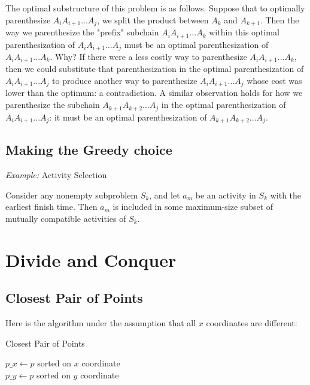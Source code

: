 \documentclass[a4paper, 12pt]{article}
\begin{document}
The optimal substructure of this problem is as follows. Suppose that to optimally parenthesize $A_iA_{i+1}...A_j$, we split the product between $A_k$ and $A_{k+1}$. Then the way we parenthesize the "prefix" subchain $A_iA_{i+1}...A_k$ within this optimal parenthesization of $A_iA_{i+1}...A_j$ must be an optimal parenthesization of $A_iA_{i+1}...A_k$. Why? If there were a less costly way to parenthesize $A_iA_{i+1}...A_k$, then we could substitute that parenthesization in the optimal parenthesization of $A_iA_{i+1}...A_j$ to produce another way to parenthesize $A_iA_{i+1}...A_j$ whose cost was lower than the optimum: a contradiction. A similar observation holds for how we parenthesize the subchain $A_{k+1}A_{k+2}...A_j$ in the optimal parenthesization of $A_iA_{i+1}...A_j$: it must be an optimal parenthesization of $A_{k+1}A_{k+2}...A_j$.

  \subsection{Making the Greedy choice}

\textit{Example:} Activity Selection

Consider any nonempty subproblem $S_k$, and let $a_m$ be an activity in $S_k$ with the earliest finish time. Then $a_m$ is included in some maximum-size subset of mutually compatible activities of $S_k$.

\section{Divide and Conquer}

  \subsection{Closest Pair of Points}

Here is the algorithm under the assumption that all $x$ coordinates are different:

\vspace{0.5cm}

\IncMargin{2em}
\begin{algorithm}[H]
\caption{Closest Pair of Points}
\vspace{0.1cm}
\Indm
{}
\Indp
\vspace{0.1cm}
$p\_x\gets p$ sorted on $x$ coordinate\\
$p\_y\gets p$ sorted on $y$ coordinate\\
\KwRet {}
\end{algorithm}
\DecMargin{2em}
\end{document}

